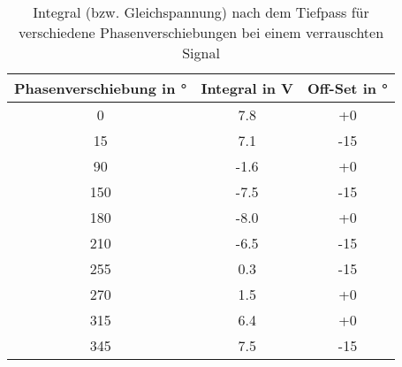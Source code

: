 \begin{table}[h!]
	\begin{center}
		\begin{tabular}{c | c | c}
			Phasenverschiebung in \si{\degree} & Integral in \si{\volt} & Off-Set in \si{\degree} \\
			\hline
			0   & 7.8 & +0 \\
			15  & 7.1 & -15 \\
			90  & -1.6 & +0 \\
			150 & -7.5 & -15 \\
			180 & -8.0 & +0 \\
			210 & -6.5 & -15 \\
			255 & 0.3 & -15 \\
			270 & 1.5 & +0 \\
			315 & 6.4 & +0 \\
			345 & 7.5 & -15
		\end{tabular}
		\caption{Integral (bzw. Gleichspannung) nach dem Tiefpass für verschiedene Phasenverschiebungen bei einem verrauschten Signal}
		\label{Integral_mit}
	\end{center}
\end{table}